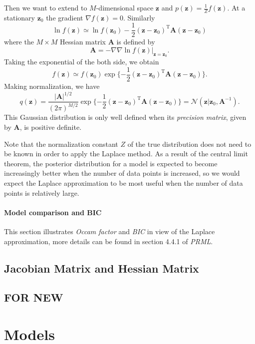 \documentclass[a4paper]{book}
\newcommand{\normD}{\mathcal{N}}
\newcommand{\mrm}{\mathrm}
\newcommand{\mbf}{\mathbf}
\newcommand{\zz}{\mbf z}
\newcommand{\trans}{^{\mrm T}}
\begin{document}
Then we want to extend to $M$-dimensional space $\zz$ and $p(\zz) = \frac 1Zf(\zz)$. At a stationary $\zz_0$ the gradient $\nabla f(\zz) =0$. Similarly
\begin{equation}\label{}
  \ln f(\zz) \simeq \ln f(\zz_0)-\frac12(\zz-\zz_0)\trans \mbf A(\zz-\zz_0)
\end{equation}
where the $M\times M$ Hessian matrix $\mbf A$ is defined by
\begin{equation}\label{}
  \mbf A = -\nabla\nabla\ln f(\zz)|_{\zz=\zz_0}.
\end{equation}
Taking the exponential of the both side, we obtain
\begin{equation}\label{}
  f(\zz) \simeq f(\zz_0)\exp\{-\frac12(\zz-\zz_0)\trans\mbf A(\zz-\zz_0)\}.
\end{equation}
Making normalization, we have
\begin{equation}\label{}
  q(\zz) = \frac{|\mbf A|^{1/2}}{(2\pi)^{M/2}}\exp\{-\frac12(\zz-\zz_0)\trans\mbf A(\zz-\zz_0)\} = \normD(\zz|\zz_0,\mbf A^{-1}).
\end{equation}
This Gaussian distribution is only well defined when its \textit{precision matrix}, given by $\mbf A$, is positive definite.

Note that the normalization constant $Z$ of the true distribution does not need to be known in order to apply the Laplace method. As a result of the central limit theorem, the posterior distribution for a model is expected to become increasingly better when the number of data points is increased, so we would expect the Laplace approximation to be most useful when the number of data points is relatively large.
\subsubsection*{Model comparison and BIC}
This section illustrates \textit{Occam factor} and \textit{BIC} in view of the Laplace approximation, more details can be found in section 4.4.1 of \textit{PRML}.


\section{Jacobian Matrix and Hessian Matrix}\label{Matrix}
\section{FOR NEW}

\chapter{Models}
\end{document}
